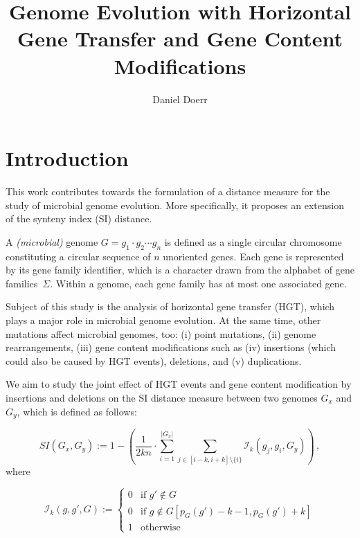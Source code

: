\documentclass[9pt,english,utf8]{article}
\title{Genome Evolution with Horizontal Gene Transfer and Gene Content
Modifications}
\author{Daniel Doerr}
\begin{document}
\maketitle
\section{Introduction}


%

This work contributes towards the formulation of a distance measure for the
study of microbial genome evolution. More specifically, it proposes an extension
of the synteny index (SI) distance. 

A \emph{(microbial)} genome $G = g_1\cdot g_2 \cdots g_n$ is defined as a single
circular chromosome constituting a circular sequence of $n$ unoriented genes.
Each gene is represented by its gene family identifier, which is a character
drawn from the alphabet of gene families~$\Sigma$. Within a genome, each gene
family has at most one associated gene.

Subject of this study is the analysis of horizontal gene transfer (HGT), which
plays a major role in microbial genome evolution. At the same time, other
mutations affect microbial genomes, too: (i) point mutations, (ii) genome
rearrangements, (iii) gene content modifications such as (iv) insertions (which
could also be caused by HGT events), deletions, and (v) duplications. 

We aim to study the joint effect of HGT events and gene content modification by
insertions and deletions on the SI distance measure between two genomes $G_x$
and $G_y$, which is defined as follows:

\begin{equation}
    SI(G_x, G_y) := 1 - \left(\frac{1}{2kn} \cdot\sum_{i=1}^{|G_x|} \sum_{j \in
    [i-k, i+k]\setminus \{i\}} \mathcal I_{k}(g_j, g_i, G_y)\right)\,,
\end{equation}
\noindent where

\[\mathcal I_{k}(g, g', G):= \begin{cases} 0 & \textrm{if } g' \not\in G\\
    0 & \textrm{if } g \not\in G[p_G(g')-k-1,p_G(g')+k] \\
    1 & \textrm{otherwise} \end{cases}
\]
\end{document}
